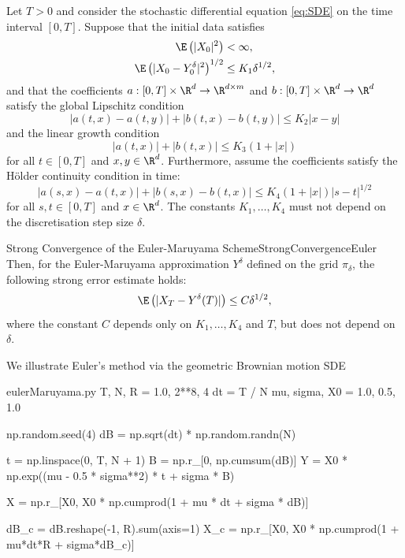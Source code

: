 Let \(T > 0\) and consider the stochastic differential equation \cref{eq:SDE} on the time interval \([0, T]\). Suppose that the initial data satisfies
\begin{align}
    \E \left(|X_0|^2\right) &< \infty, \label{eq:InitialMoment} \\
    \E \left(|X_0 - Y^\delta_0|^2\right)^{1/2} &\leq K_1 \delta^{1/2}, \label{eq:InitialApproximationError}
\end{align}
and that the coefficients \(a: [0, T] \times \R^d \to \R^{d \times m}\) and \(b: [0, T] \times \R^d \to \R^d\) satisfy the global Lipschitz condition
\begin{equation}
    |a(t, x) - a(t, y)| + |b(t, x) - b(t, y)| \leq K_2 |x - y| \label{eq:LipschitzConditionSDENumerics}
\end{equation}
and the linear growth condition
\begin{equation}
    |a(t, x)| + |b(t, x)| \leq K_3 (1 + |x|) \label{eq:LinearGrowthCondition}
\end{equation}
for all \(t \in [0, T]\) and \(x, y \in \R^d\). Furthermore, assume the coefficients satisfy the Hölder continuity condition in time:
\begin{equation}
    |a(s, x) - a(t, x)| + |b(s, x) - b(t, x)| \leq K_4 (1 + |x|) |s - t|^{1/2} \label{eq:HolderContinuity}
\end{equation}
for all \(s, t \in [0, T]\) and \(x \in \R^d\). The constants \(K_1, \dots, K_4\) must not depend on the discretisation step size \(\delta\).

\begin{thm}{Strong Convergence of the Euler-Maruyama Scheme}{StrongConvergenceEuler}
    Then, for the Euler-Maruyama approximation \(Y^\delta\) defined on the grid \(\pi_\delta\), the following strong error estimate holds:
    \begin{equation}
        \E \left(|X_T - Y^\delta(T)|\right) \leq C \delta^{1/2}, \label{eq:StrongConvergenceBound}
    \end{equation}
    where the constant \(C\) depends only on \(K_1, \dots, K_4\) and \(T\), but does not depend on \(\delta\).
\end{thm}

We illustrate Euler’s method via the geometric Brownian motion SDE

\begin{Pcode}{eulerMaruyama.py}
    T, N, R = 1.0, 2**8, 4
    dt = T / N
    mu, sigma, X0 = 1.0, 0.5, 1.0

    np.random.seed(4)
    dB = np.sqrt(dt) * np.random.randn(N)

    t = np.linspace(0, T, N + 1)
    B = np.r_[0, np.cumsum(dB)]
    Y = X0 * np.exp((mu - 0.5 * sigma**2) * t + sigma * B)

    X = np.r_[X0, X0 * np.cumprod(1 + mu * dt + sigma * dB)]

    dB_c = dB.reshape(-1, R).sum(axis=1)
    X_c = np.r_[X0, X0 * np.cumprod(1 + mu*dt*R + sigma*dB_c)]
\end{Pcode}

